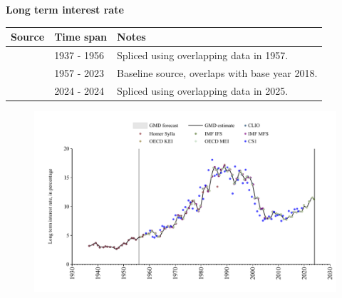 \documentclass[12pt,a4paper,landscape]{article}
\begin{document}
\begin{adjustbox}{max totalsize={\paperwidth}{\paperheight},center}
\begin{minipage}[t][\textheight][t]{\textwidth}
\vspace*{0.5cm}
{}
\begin{center}
{\Large\bfseries Long term interest rate}
\end{center}
\vspace{0.5cm}
\begin{table}[H]
\centering
\small
\begin{tabular}{|l|l|l|}
\hline
\textbf{Source} & \textbf{Time span} & \textbf{Notes} \\
\hline
\rowcolor{white}\cite{Homer_Sylla}& 1937 - 1956 &Spliced using overlapping data in 1957. \\
\rowcolor{lightgray}\cite{OECD_MEI}& 1957 - 2023 &Baseline source, overlaps with base year 2018. \\
\rowcolor{white}\cite{IMF_IFS}& 2024 - 2024 &Spliced using overlapping data in 2025. \\
\hline
\end{tabular}
\end{table}
\begin{figure}[H]
\centering
\includegraphics[width=\textwidth,height=0.6\textheight,keepaspectratio]{graphs/ZAF_ltrate.pdf}
\end{figure}
\end{minipage}
\end{adjustbox}
\end{document}
